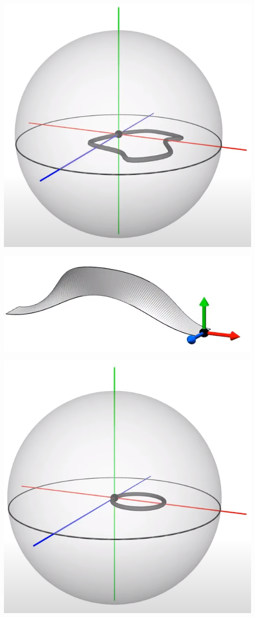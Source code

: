 \documentclass[10pt]{beamer}
\begin{document}
    \includegraphics[scale=0.1]{Pictures/randomrotsphere.png}

    \includegraphics[scale=0.1]{Pictures/contractiblepathbelt.png}

    \includegraphics[scale=0.1]{Pictures/contractiblepathsphere.png}
\end{document}
